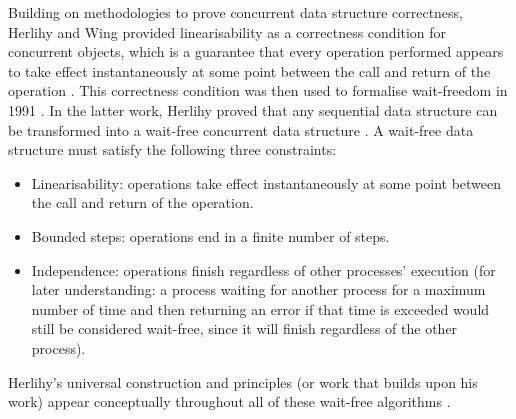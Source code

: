 Building on methodologies to prove concurrent data structure correctness, Herlihy and Wing provided linearisability as a correctness condition for concurrent objects, which is a guarantee that every operation performed appears to take effect instantaneously at some point between the call and return of the operation \cite{HerlihyLinearizability}. This correctness condition was then used to formalise wait-freedom in 1991 \cite{herlihy1991wait}. In the latter work, Herlihy proved that any sequential data structure can be transformed into a wait-free concurrent data structure \cite{herlihy1991wait}. A wait-free data structure must satisfy the following three constraints: 
\begin{itemize}
   \item Linearisability: operations take effect instantaneously at some point between the call and return of the operation.
   \item Bounded steps: operations end in a finite number of steps.
   \item Independence: operations finish regardless of other processes' execution (for later understanding: a process waiting for another process for a maximum number of time and then returning an error if that time is exceeded would still be considered wait-free, since it will finish regardless of the other process).
\end{itemize}
\cite{herlihy1991wait,HerlihyLinearizability}

Herlihy's universal construction and principles (or work that builds upon his work) appear conceptually throughout all of these wait-free algorithms \cite{Kogan2011WaitFreeQueues,FeldmanDechev2015WaitFreeRingBuffer,kogan2012methodology,FeldmanDechevV2,FeldmanDechevV3,RamalheteQueue,wCQWaitFreeQueue,Verma2013Scalable,FastFetchAndAddWaitFreeQueue,WangCacheCoherent,adampsc,jiffy,JayantiLog,Drescher2015GuardedSections,Mateíspmc,torquati2010singleproducersingleconsumerqueuessharedcache,Aldinucci2012EfficientSync,Wang2013BQueue,MaffioneCacheAware,ffq}. \cite{herlihy1991wait}

